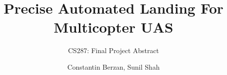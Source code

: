 \documentclass[10pt, twocolumn]{scrartcl} %
\title{Precise Automated Landing For Multicopter UAS}
\subtitle{CS287: Final Project Abstract}
\author{Constantin Berzan, Sunil Shah}
\date{}
\begin{document}
\maketitle





\nocite{*}
\printbibliography
\end{document}
